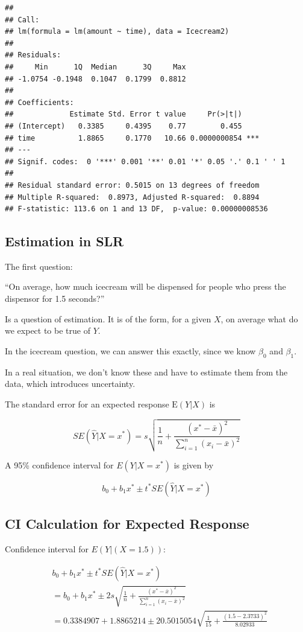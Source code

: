 \documentclass[]{book}
\begin{document}
\begin{verbatim}
## 
## Call:
## lm(formula = lm(amount ~ time), data = Icecream2)
## 
## Residuals:
##     Min      1Q  Median      3Q     Max 
## -1.0754 -0.1948  0.1047  0.1799  0.8812 
## 
## Coefficients:
##             Estimate Std. Error t value     Pr(>|t|)    
## (Intercept)   0.3385     0.4395    0.77        0.455    
## time          1.8865     0.1770   10.66 0.0000000854 ***
## ---
## Signif. codes:  0 '***' 0.001 '**' 0.01 '*' 0.05 '.' 0.1 ' ' 1
## 
## Residual standard error: 0.5015 on 13 degrees of freedom
## Multiple R-squared:  0.8973, Adjusted R-squared:  0.8894 
## F-statistic: 113.6 on 1 and 13 DF,  p-value: 0.00000008536
\end{verbatim}

\subsection{Estimation in SLR}\label{estimation-in-slr}

The first question:

``On average, how much icecream will be dispensed for people who press
the dispensor for 1.5 seconds?''

Is a question of estimation. It is of the form, for a given \(X\), on
average what do we expect to be true of \(Y\).

In the icecream question, we can answer this exactly, since we know
\(\beta_0\) and \(\beta_1\).

In a real situation, we don't know these and have to estimate them from
the data, which introduces uncertainty.

The standard error for an expected response \(\text{E}(Y|X)\) is

\[
SE(\hat{Y}|X=x^*) = s\sqrt{\frac{1}{n}+ \frac{(x^*-\bar{x})^2}{\displaystyle\sum_{i=1}^n(x_i-\bar{x})^2}}
\]

A 95\% confidence interval for \(E(Y|X=x^*)\) is given by

\[
b_0+b_1x^* \pm t^*SE(\hat{Y}|X=x^*)
\]

\subsection{CI Calculation for Expected
Response}\label{ci-calculation-for-expected-response}

Confidence interval for \(E(Y | (X=1.5))\):

\[
\begin{aligned}
& b_0+b_1x^* \pm t^*SE(\hat{Y}|X=x^*) \\
& = b_0+b_1x^* \pm 2s\sqrt{\frac{1}{n}+ \frac{(x^*-\bar{x})^2}{\displaystyle\sum_{i=1}^n(x_i-\bar{x})^2}}  \\
& = 0.3384907 + 1.8865214 \pm 20.5015054 \sqrt{\frac{1}{15}+ \frac{(1.5-2.3733)^2}{8.02933}}
\end{aligned}
\]
\end{document}
